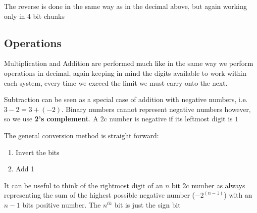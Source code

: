 \documentclass[english,course]{Notes}
\begin{document}
		      \par{The reverse is done in the same way as in the decimal above, but again working only in 4 bit chunks}
	     
	     \subsection{Operations}

	\par{Multiplication and Addition are performed much like in the same way we perform operations in decimal, again keeping in mind the digits available to work within each system, every time we exceed the limit we must carry onto the next.}
	
	\par{Subtraction can be seen as a special case of addition with negative numbers, i.e. $3 - 2 = 3 + (-2)$. Binary numbers cannot represent negative numbers however, so we use \textbf{2's complement}. A 2c number is negative if its leftmost digit is $1$}
	
	\newpage
	
	\par{The general conversion method is straight forward:}
	\begin{enumerate}
		\item Invert the bits
		\item Add 1
	\end{enumerate}
	
	\par{It can be useful to think of the rightmost digit of an $n$ bit 2c number as always representing the sum of  the highest possible negative number ($-2^{(n-1)}$) with an $n-1$ bits positive number. The $n^{th}$ bit is just the sign bit }
	
	
\end{document}
